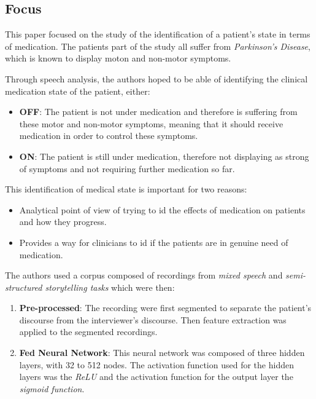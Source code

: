 \documentclass{Paper_Summary}
\begin{document}
\makepapertitle

\breakline

\begin{center}
    \section*{Focus}
\end{center}

    This paper focused on the study of the identification of a patient's state in terms of medication. The patients part of the study all suffer from \emph{Parkinson's Disease}, which is known to display moton and non-motor symptoms.

    Through speech analysis, the authors hoped to be able of identifying the clinical medication state of the patient, either:
    \begin{itemize}
        \item \textbf{OFF}: The patient is not under medication and therefore is suffering from these motor and non-motor symptoms, meaning that it should receive medication in order to control these symptoms.
        \item \textbf{ON}: The patient is still under medication, therefore not displaying as strong of symptoms and not requiring further medication so far.
    \end{itemize}

    This identification of medical state is important for two reasons:
    \begin{itemize}
        \item Analytical point of view of trying to id the effects of medication on patients and how they progress.
        \item Provides a way for clinicians to id if the patients are in genuine need of medication.
    \end{itemize}

    The authors used a corpus composed of recordings from \emph{mixed speech} and \emph{semi-structured storytelling tasks} which were then:
    \begin{enumerate}
        \item \textbf{Pre-processed}: The recording were first segmented to separate the patient's discourse from the interviewer's discourse. Then feature extraction was applied to the segmented recordings.
        \item \textbf{Fed Neural Network}: This neural network was composed of three hidden layers, with 32 to 512 nodes. The activation function used for the hidden layers was the \emph{ReLU} and the activation function for the output layer the \emph{sigmoid function}.
    \end{enumerate}
\end{document}
